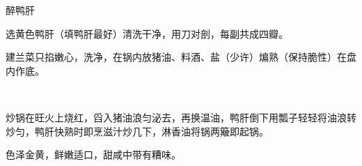%
%
%
%
%
%
%
\begin{recipe}{醉鸭肝}

\ingredients


\preparation

\step 选黄色鸭肝（填鸭肝最好）清洗干净，用刀对剖，每副共成四瓣。

\step 建兰菜只掐嫩心，洗净，在锅内放猪油、料酒、盐（少许）煸熟（保持脆性）在盘
内作底。

\step 𰪿糟浮子、甜酱、酱油、胡椒面、白糖、味精、水豆粉及清汤少许兑成滋汁。

\step 炒锅在旺火上烧红，舀入猪油浪匀泌去，再换温油，鸭肝倒下用瓢子轻轻将油浪转
炒匀，鸭肝快熟时即烹滋汁炒几下，淋香油将锅两簸即起锅。

\features

色泽金黄，鲜嫩适口，甜咸中带有糟味。

\end{recipe}

